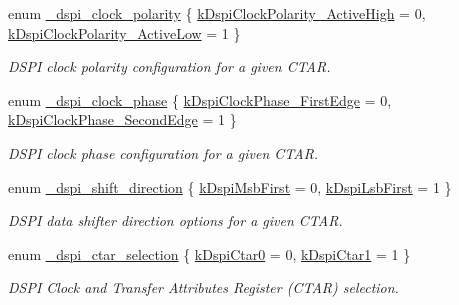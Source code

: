 \begin{DoxyCompactItemize}
\item 
enum \hyperlink{group__dspi__hal_ga8324f34ea4af085c11052288fc94983e}{\+\_\+dspi\+\_\+clock\+\_\+polarity} \{ \hyperlink{group__dspi__hal_gga8324f34ea4af085c11052288fc94983eafffdb6de18c3b46c509c406ac7230586}{k\+Dspi\+Clock\+Polarity\+\_\+\+Active\+High} = 0, 
\hyperlink{group__dspi__hal_gga8324f34ea4af085c11052288fc94983ea415b9652394fc6b7c50f5d5377426b13}{k\+Dspi\+Clock\+Polarity\+\_\+\+Active\+Low} = 1
 \}\begin{DoxyCompactList}\small\item\em D\+S\+PI clock polarity configuration for a given C\+T\+AR. \end{DoxyCompactList}
\item 
enum \hyperlink{group__dspi__hal_ga648d70d13ec12505a80c423841f53510}{\+\_\+dspi\+\_\+clock\+\_\+phase} \{ \hyperlink{group__dspi__hal_gga648d70d13ec12505a80c423841f53510ada723d5970a0b0a28d96a0e707cabd9c}{k\+Dspi\+Clock\+Phase\+\_\+\+First\+Edge} = 0, 
\hyperlink{group__dspi__hal_gga648d70d13ec12505a80c423841f53510a4f1c4fe8e246d3a87f60c99d214d8921}{k\+Dspi\+Clock\+Phase\+\_\+\+Second\+Edge} = 1
 \}\begin{DoxyCompactList}\small\item\em D\+S\+PI clock phase configuration for a given C\+T\+AR. \end{DoxyCompactList}
\item 
enum \hyperlink{group__dspi__hal_gaf1134e11fc318e82a6c15882fdab2760}{\+\_\+dspi\+\_\+shift\+\_\+direction} \{ \hyperlink{group__dspi__hal_ggaf1134e11fc318e82a6c15882fdab2760aed75ebb641f649ff0c4eb77d2624bcf2}{k\+Dspi\+Msb\+First} = 0, 
\hyperlink{group__dspi__hal_ggaf1134e11fc318e82a6c15882fdab2760a582f124b275827ec23b5e4a1a70b25a7}{k\+Dspi\+Lsb\+First} = 1
 \}\begin{DoxyCompactList}\small\item\em D\+S\+PI data shifter direction options for a given C\+T\+AR. \end{DoxyCompactList}
\item 
enum \hyperlink{group__dspi__hal_ga78060c4222b1affc8e41f937909ee999}{\+\_\+dspi\+\_\+ctar\+\_\+selection} \{ \hyperlink{group__dspi__hal_gga78060c4222b1affc8e41f937909ee999a21d94da5d7c4e6134907fad358147b35}{k\+Dspi\+Ctar0} = 0, 
\hyperlink{group__dspi__hal_gga78060c4222b1affc8e41f937909ee999a46f7fb3102bd17be1feeec4ef83f9573}{k\+Dspi\+Ctar1} = 1
 \}\begin{DoxyCompactList}\small\item\em D\+S\+PI Clock and Transfer Attributes Register (C\+T\+AR) selection. \end{DoxyCompactList}

\end{DoxyCompactItemize}
